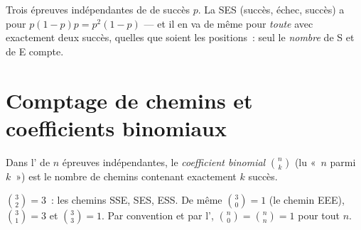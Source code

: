 \begin{example}\label{ex:g11:binom:threetrials}
Trois épreuves indépendantes de  de succès $p$. La  SES
(succès, échec, succès) a pour  $p(1-p)p = p^2(1-p)$ --- et
il en va de même pour \emph{toute}  avec exactement deux succès,
quelles que soient les positions~: seul le \emph{nombre} de S et de E
compte.
\end{example}

\section{Comptage de chemins et coefficients binomiaux}

\begin{definition}\label{def:g11:binom:coefficient}
Dans l' de $n$ épreuves indépendantes, le \emph{coefficient
binomial} $\binom{n}{k}$ (lu «~$n$ parmi
$k$~») est le nombre de chemins contenant exactement $k$ succès.
\end{definition}

\begin{example}
$\binom{3}{2} = 3$~: les chemins SSE, SES, ESS. De même
$\binom{3}{0} = 1$ (le chemin EEE), $\binom{3}{1} = 3$ et
$\binom{3}{3} = 1$. Par convention et par l',
$\binom n0 = \binom nn = 1$ pour tout $n$.
\end{example}

